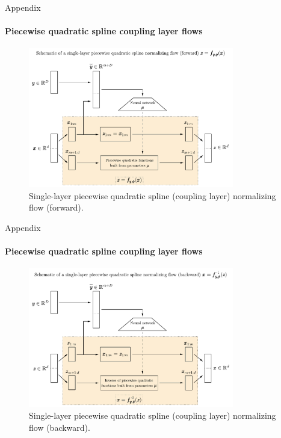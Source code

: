 \documentclass{beamer}
\begin{document}
\begin{frame}[allowframebreaks]{Appendix}
	\vspace{-0.5cm}
	\framesubtitle{Piecewise quadratic spline coupling layer flows}
	\begin{figure}[h]
		\centering
		\includegraphics[width=0.8\textwidth]{figures/thesis/piecewisequadraticsplineflow_forward.pdf}
		\caption{Single-layer piecewise quadratic spline (coupling layer) normalizing flow (forward).}
		\label{fig:nflowquadratic_forward}
	\end{figure}
\end{frame}

\begin{frame}[allowframebreaks]{Appendix}
	\vspace{-0.5cm}
	\framesubtitle{Piecewise quadratic spline coupling layer flows}
	\begin{figure}[h]
		\centering
		\includegraphics[width=0.8\textwidth]{figures/thesis/piecewisequadraticsplineflow_backward.pdf}
		\caption{Single-layer piecewise quadratic spline (coupling layer) normalizing flow (backward).}
		\label{fig:nflowquadratic_backward}
	\end{figure}
\end{frame}
\end{document}
